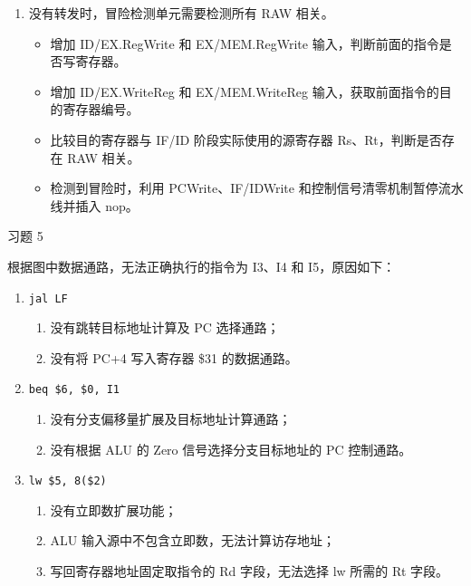 \begin{problem}
\begin{solution}
\begin{enumerate}
            \item[\textbf{4)}] 没有转发时，冒险检测单元需要检测所有 RAW 相关。
            \begin{itemize}
                \item 增加 ID/EX.RegWrite 和 EX/MEM.RegWrite 输入，判断前面的指令是否写寄存器。
                \item 增加 ID/EX.WriteReg 和 EX/MEM.WriteReg 输入，获取前面指令的目的寄存器编号。
                \item 比较目的寄存器与 IF/ID 阶段实际使用的源寄存器 Rs、Rt，判断是否存在 RAW 相关。
                \item 检测到冒险时，利用 PCWrite、IF/IDWrite 和控制信号清零机制暂停流水线并插入 nop。
            \end{itemize}
        \end{enumerate}
    \end{solution}
\end{problem}

\begin{problem}
    习题 5
    \begin{solution}
        根据图中数据通路，无法正确执行的指令为 I3、I4 和 I5，原因如下：
        \begin{enumerate}
            \item[\textbf{I3：}] \texttt{jal LF}
            \begin{enumerate}
                \item 没有跳转目标地址计算及 PC 选择通路；
                \item 没有将 PC+4 写入寄存器 \$31 的数据通路。
            \end{enumerate}

            \item[\textbf{I4：}] \texttt{beq \$6, \$0, I1}
            \begin{enumerate}
                \item 没有分支偏移量扩展及目标地址计算通路；
                \item 没有根据 ALU 的 Zero 信号选择分支目标地址的 PC 控制通路。
            \end{enumerate}

            \item[\textbf{I5：}] \texttt{lw \$5, 8(\$2)}
            \begin{enumerate}
                \item 没有立即数扩展功能；
                \item ALU 输入源中不包含立即数，无法计算访存地址；
                \item 写回寄存器地址固定取指令的 Rd 字段，无法选择 lw 所需的 Rt 字段。
            \end{enumerate}
        \end{enumerate}
    \end{solution}
\end{problem}
